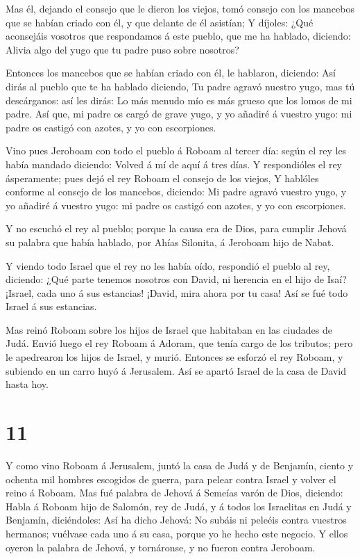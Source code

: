  Mas él, dejando el consejo que le dieron los viejos, tomó
consejo con los mancebos que se habían criado con él, y que delante de
él asistían;  Y díjoles: ¿Qué aconsejáis vosotros que
respondamos á este pueblo, que me ha hablado, diciendo: Alivia algo del
yugo que tu padre puso sobre nosotros?

 Entonces los mancebos que se habían criado con él, le
hablaron, diciendo: Así dirás al pueblo que te ha hablado diciendo, Tu
padre agravó nuestro yugo, mas tú descárganos: así les dirás: Lo más
menudo mío es más grueso que los lomos de mi padre.  Así
que, mi padre os cargó de grave yugo, y yo añadiré á vuestro yugo: mi
padre os castigó con azotes, y yo con escorpiones.

 Vino pues Jeroboam con todo el pueblo á Roboam al tercer
día: según el rey les había mandado diciendo: Volved á mí de aquí á tres
días.  Y respondióles el rey ásperamente; pues dejó el rey
Roboam el consejo de los viejos,  Y hablóles conforme al
consejo de los mancebos, diciendo: Mi padre agravó vuestro yugo, y yo
añadiré á vuestro yugo: mi padre os castigó con azotes, y yo con
escorpiones.

 Y no escuchó el rey al pueblo; porque la causa era de
Dios, para cumplir Jehová su palabra que había hablado, por Ahías
Silonita, á Jeroboam hijo de Nabat.

 Y viendo todo Israel que el rey no les había oído,
respondió el pueblo al rey, diciendo: ¿Qué parte tenemos nosotros con
David, ni herencia en el hijo de Isaí? ¡Israel, cada uno á sus
estancias! ¡David, mira ahora por tu casa! Así se fué todo Israel á sus
estancias.

 Mas reinó Roboam sobre los hijos de Israel que habitaban
en las ciudades de Judá.  Envió luego el rey Roboam á
Adoram, que tenía cargo de los tributos; pero le apedrearon los hijos de
Israel, y murió. Entonces se esforzó el rey Roboam, y subiendo en un
carro huyó á Jerusalem.  Así se apartó Israel de la casa de
David hasta hoy.

\hypertarget{section-10}{%
\section{11}\label{section-10}}

 Y como vino Roboam á Jerusalem, juntó la casa de Judá y de
Benjamín, ciento y ochenta mil hombres escogidos de guerra, para pelear
contra Israel y volver el reino á Roboam.  Mas fué palabra
de Jehová á Semeías varón de Dios, diciendo:  Habla á Roboam
hijo de Salomón, rey de Judá, y á todos los Israelitas en Judá y
Benjamín, diciéndoles:  Así ha dicho Jehová: No subáis ni
peleéis contra vuestros hermanos; vuélvase cada uno á su casa, porque yo
he hecho este negocio. Y ellos oyeron la palabra de Jehová, y
tornáronse, y no fueron contra Jeroboam.

